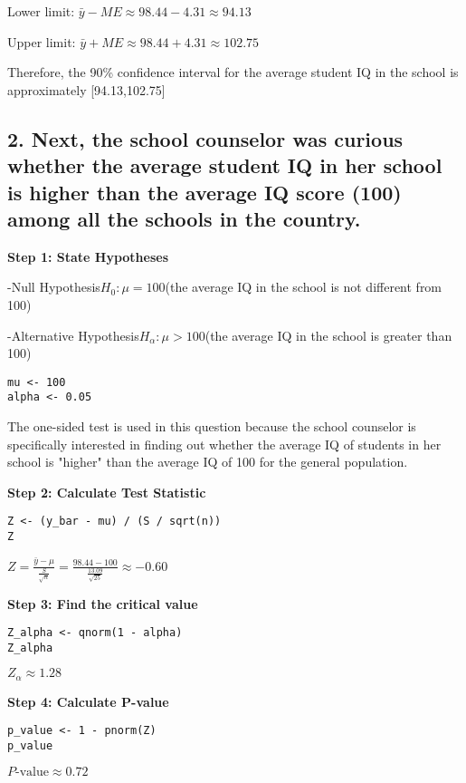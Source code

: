 \documentclass[12pt]{article}
\begin{document}
Lower limit: $\bar{y} - ME \approx 98.44 - 4.31 \approx 94.13$

Upper limit: $\bar{y} + ME \approx 98.44 + 4.31 \approx 102.75$


Therefore, the 90\% confidence interval for the average student IQ in the school is approximately [94.13,102.75]
\subsection*{2. Next, the school counselor was curious whether the average student IQ in her school is higher than the average IQ score (100) among all the schools in the country.}

\textbf{Step 1: State Hypotheses}

\vspace{12pt}
-Null Hypothesis$H_0: \mu = 100$(the average IQ in the school is not different from 100)

-Alternative Hypothesis$H_\alpha: \mu > 100$(the average IQ in the school is greater than 100)
\vspace{12pt}
\begin{lstlisting}[style=my]
mu <- 100
alpha <- 0.05
\end{lstlisting}

The one-sided test is used in this question because the school counselor is specifically interested in finding out whether the average IQ of students in her school is "higher" than the average IQ of 100 for the general population.

\textbf{Step 2: Calculate Test Statistic}
\begin{lstlisting}[style=my]
Z <- (y_bar - mu) / (S / sqrt(n))
Z
\end{lstlisting}
\vspace{12pt}
$Z = \frac{\bar{y} - \mu}{\frac{S}{\sqrt{n}}} = \frac{98.44 - 100}{\frac{13.09}{\sqrt{25}}} \approx -0.60$
\vspace{12pt}

\textbf{Step 3: Find the critical value}
\begin{lstlisting}[style=my]
Z_alpha <- qnorm(1 - alpha)
Z_alpha
\end{lstlisting}
$Z_\alpha \approx 1.28$

\textbf{Step 4: Calculate P-value}
\begin{lstlisting}[style=my]
p_value <- 1 - pnorm(Z)
p_value
\end{lstlisting}

\( P\text{-value} \approx 0.72 \)
\end{document}
